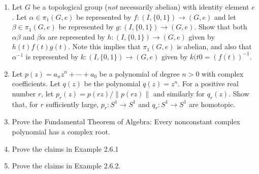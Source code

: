 \documentclass[12pt,a4paper]{report}
\begin{document}
\begin{enumerate}[label=2.7.\arabic*]
	\item Let $G$ be a topological group (\textit{not} necessarily abelian) with identity element $e$.  Let $\alpha\in \pi_1(G, e)$ be represented by $f:(I,\{0,1\})\to (G,e)$ and let $\beta \in \pi_1(G,e)$ be represented by $g:(I,\{0,1\})\to(G,e)$.  Show that both $\alpha\beta$ and $\beta\alpha$ are represented by $h:(I,\{0,1\})\to (G,e)$ given by $h(t)f(t)g(t)$.  Note this implies that $\pi_1(G,e)$ is abelian, and also that $\alpha^{-1}$ is represented by $k:(I,\{0,1\})\to (G,e)$ given by $k(t0=(f(t))^{-1}$.
	
	\item Let $p(z)=a_nz^n+\cdots+a_0$ be a polynomial of degree $n>0$ with complex coefficients.  Let $q(z)$ be the polynomial $q(z)=z^n$.  For a positive real number $r$, let $p_r(z)=p(rz)/\|p(rz)\|$ and similarly for $q_r(z)$.  Show that, for $r$ sufficiently large, $p_r:S^1\to S^1$ and $q_r: S^1\to S^1$ are homotopic.
	
	\item Prove the Fundamental Theorem of Algebra: Every nonconstant complex polynomial has a complex root.
	
	\item Prove the claims in Example 2.6.1
	
	\item Prove the claims in Example 2.6.2.
\end{enumerate}
\end{document}
